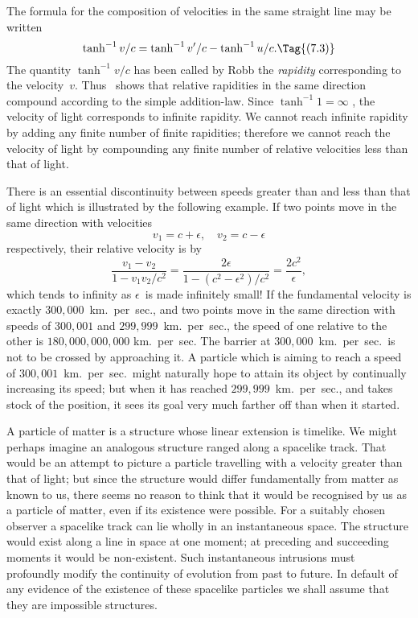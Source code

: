 \documentclass[12pt]{book}
\begin{document}
The formula  for the composition of velocities in the same straight
%
%
line may be written
\[
\tanh^{-1} v/c = \tanh^{-1} v'/c - \tanh^{-1} u/c.
\Tag{(7.3)}
\]
The quantity $\tanh^{-1} v/c$ has been called by Robb the \emph{rapidity} corresponding
%
to the velocity~$v$. Thus ~shows that relative rapidities in the same direction
compound according to the simple addition-law. Since $\tanh^{-1} 1 = \infty$ , the
velocity of light corresponds to infinite rapidity. We cannot reach infinite
rapidity by adding any finite number of finite rapidities; therefore we cannot
reach the velocity of light by compounding any finite number of relative
velocities less than that of light.

There is an essential discontinuity between speeds greater than and less
than that of light which is illustrated by the following example. If two points
%
move in the same direction with velocities
\[
v_{1} = c + \epsilon,\quad
v_{2} = c - \epsilon
\]
respectively, their relative velocity is by~
\[
\frac{v_{1} - v_{2}}{1 - v_{1}v_{2}/c^{2}}
= \frac{2\epsilon}{1 - (c^{2} - \epsilon^{2})/c^{2}}
= \frac{2c^{2}}{\epsilon},
\]
which tends to infinity as $\epsilon$~is made infinitely small! If the fundamental
velocity is exactly $300,000$~km.\ per~sec., and two points move in the same
direction with speeds of $300,001$ and $299,999$~km.\ per~sec., the speed of one
relative to the other is $180,000,000,000$ km.\ per~sec. The barrier at $300,000$~km.\
per~sec.\ is not to be crossed by approaching it. A particle which is aiming to
reach a speed of $300,001$~km.\ per~sec.\ might naturally hope to attain its object
by continually increasing its speed; but when it has reached $299,999$~km.\ per~sec.,
and takes stock of the position, it sees its goal very much farther off than
when it started.

A particle of matter is a structure whose linear extension is timelike. We
might perhaps imagine an analogous structure ranged along a spacelike track.
That would be an attempt to picture a particle travelling with a velocity
greater than that of light; but since the structure would differ fundamentally
from matter as known to us, there seems no reason to think that it would be
recognised by us as a particle of matter, even if its existence were possible.
For a suitably chosen observer a spacelike track can lie wholly in an instantaneous
space. The structure would exist along a line in space at one moment;
at preceding and succeeding moments it would be non-existent. Such instantaneous
intrusions must profoundly modify the continuity of evolution from
past to future. In default of any evidence of the existence of these spacelike
particles we shall assume that they are impossible structures.
\end{document}
